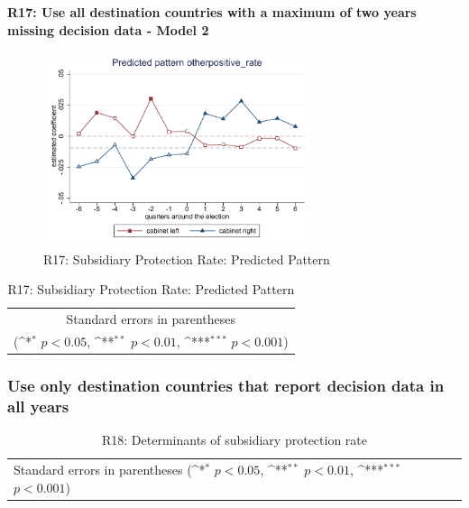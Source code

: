 \documentclass[10pt,a4paper]{scrartcl}
\begin{document}
\clearpage
\textbf{R17: Use all destination countries with a maximum of two years missing decision data - Model 2}
\begin{figure}[!ht]
	\centering
	\includegraphics[width=0.7\textwidth]{figures_edited/otherpositive_rate_graph2_R17.pdf}
	\caption{R17: Subsidiary Protection Rate: Predicted Pattern}
\end{figure}

\begin{table}[!ht]\centering
	\footnotesize
	\renewcommand{\arraystretch}{1.15}
	\def\sym#1{\ifmmode^{#1}\else\(^{#1}\)\fi}
	\caption{R17: Subsidiary Protection Rate: Predicted Pattern}
	\begin{tabular}{l*{2}{c}}
		\hline\hline
		
		\hline\hline
		\multicolumn{3}{c}{\footnotesize Standard errors in parentheses} \\
		\multicolumn{3}{c}{\footnotesize (\sym{*} \(p<0.05\), \sym{**} \(p<0.01\), \sym{***} \(p<0.001\))} \\
	\end{tabular}
\end{table}




\clearpage
\FloatBarrier
\subsubsection{Use only destination countries that report decision data in all years}
\begin{table}[!ht]\centering
	\renewcommand{\arraystretch}{1.25}
	\small
	\def\sym#1{\ifmmode^{#1}\else\(^{#1}\)\fi}
	\caption{R18: Determinants of subsidiary protection rate}
	\begin{tabular}{l*{3}{c}}
		\hline\hline
		
		\hline\hline
		\multicolumn{4}{l}{\footnotesize Standard errors in parentheses (\sym{*} \(p<0.05\), \sym{**} \(p<0.01\), \sym{***} \(p<0.001\))}\\
	\end{tabular}
\end{table}
\end{document}
